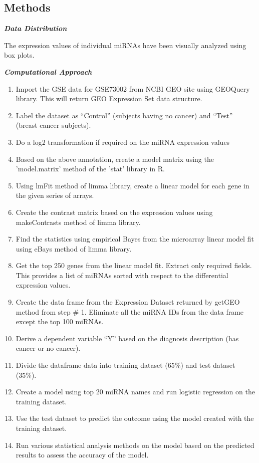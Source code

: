 \documentclass{bioinfo}
\begin{document}
\begin{methods}
\section{Methods}

{\textbf {\emph{Data Distribution}}}

The expression values of individual miRNAs have been visually analyzed using box plots.


{\textbf {\emph{Computational Approach}}}
\begin{enumerate}
  \item Import the GSE data for GSE73002 from NCBI GEO site using GEOQuery library. This will return GEO Expression Set data structure.
  \item Label the dataset as “Control” (subjects having no cancer) and “Test” (breast cancer subjects).
  \item Do a log2 transformation if required on the miRNA expression values
  \item Based on the above annotation, create a model matrix using the 'model.matrix' method of the 'stat' library in R.
  \item Using lmFit method of limma library, create a linear model for each gene in the given series of arrays.
  \item Create the contrast matrix based on the expression values using makeContrasts method of limma library.
  \item Find the statistics using empirical Bayes from the microarray linear model fit using eBays method of limma library.
  \item Get the top 250 genes from the linear model fit. Extract only required fields. This provides a list of miRNAs sorted with respect to the differential expression values.
  \item Create the data frame from the Expression Dataset returned by getGEO method from step \# 1. Eliminate all the miRNA IDs from the data frame except the top 100 miRNAs.
  \item Derive a dependent variable “Y” based on the diagnosis description (has cancer or no cancer).
  \item Divide the dataframe data into training dataset (65\%) and test dataset (35\%).
  \item Create a model using top 20 miRNA names and run logistic regression on the training dataset.
  \item Use the test dataset to predict the outcome using the model created with the training dataset.
  \item Run various statistical analysis methods on the model based on the predicted results to assess the accuracy of the model.


\end{enumerate}
\end{methods}
\end{document}
